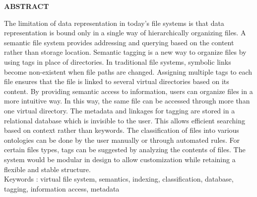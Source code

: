 \begin{center}
\thispagestyle{empty}
\vspace*{4\baselineskip}
\LARGE{\textbf{ABSTRACT}}\\[1.0cm]
\end{center}
\thispagestyle{empty}
\large{{The limitation of data representation in today's file systems is that data representation is bound only in a single way of hierarchically organizing files. A semantic file system provides addressing and querying based on the content rather than storage location. Semantic tagging is a new way to organize files by using tags in place of directories.  In traditional file systems, symbolic links become non-existent when file paths are changed. Assigning multiple tags to each file ensures that the file is linked to several virtual directories based on its content. By providing semantic access to information, users can organize files in a more intuitive way. In this way, the same file can be accessed through more than one virtual directory. The metadata and linkages for tagging are stored in a relational database which is invisible to the user. This allows efficient searching based on context rather than keywords. The classification of files into various ontologies can be done by the user manually or through automated rules. For certain files types, tags can be suggested by analyzing the contents of files. The system would be modular in design to allow customization while retaining a flexible and stable structure. \\[1cm]}}
Keywords : virtual file system, semantics, indexing, classification, database, tagging, information access, metadata
